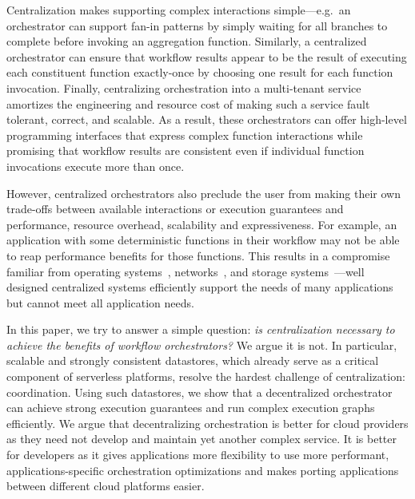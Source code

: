 Centralization makes supporting complex interactions simple---e.g.\ an
orchestrator can support fan-in patterns by simply waiting for all branches to
complete before invoking an aggregation function. Similarly, a centralized
orchestrator can ensure that workflow results appear to be the result of
executing each constituent function exactly-once by choosing one result for
each function invocation. Finally, centralizing orchestration into a
multi-tenant service amortizes the engineering and resource cost of making such
a service fault tolerant, correct, and scalable. As a result, these
orchestrators can offer high-level programming interfaces that express complex
function interactions while promising that workflow results are consistent even
if individual function invocations execute more than once.


However, centralized orchestrators also preclude the user from making their own
trade-offs between available interactions or execution guarantees and
performance, resource overhead, scalability and expressiveness. For example, an
application with some deterministic functions in their workflow may not be able
to reap performance benefits for those functions. This results in a compromise
familiar from operating systems~\cite{exokernel,spin},
networks~\cite{active-networks,sdn}, and storage
systems~\cite{comet,splinter}---well designed centralized systems efficiently
support the needs of many applications but cannot meet all application needs.
%

In this paper, we try to answer a simple question: \textit{is centralization
\emph{necessary} to achieve the benefits of workflow  orchestrators?} We argue
it is not. In particular, scalable and strongly consistent datastores, which already serve as a critical component of serverless platforms, resolve the hardest
challenge of centralization: coordination. Using such datastores, we show that a
decentralized orchestrator can achieve strong execution guarantees and run
complex execution graphs efficiently. We argue that decentralizing orchestration
is better for cloud providers as they need not develop and maintain yet another
complex service. It is better for developers as it gives applications more
flexibility to use more performant, applications-specific orchestration
optimizations and makes porting applications between different cloud platforms
easier.

